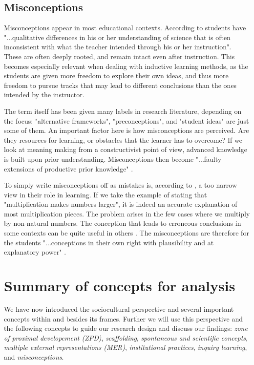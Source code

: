 \subsection{Misconceptions}
Misconceptions appear in most educational contexts. According to \citet[p. 437]{gomez2008elementary} students have "...qualitative differences in his or her understanding of science that is often inconsistent with what the teacher intended through his or her instruction". These are often deeply rooted, and remain intact even after instruction. This becomes especially relevant when dealing with inductive learning methods, as the students are given more freedom to explore their own ideas, and thus more freedom to pursue tracks that may lead to different conclusions than the ones intended by the instructor.

The term itself has been given many labels in research literature, depending on the focus: "alternative frameworks", "preconceptions", and "student ideas" are just some of them. An important factor here is how misconceptions are perceived. Are they resources for learning, or obstacles that the learner has to overcome? If we look at meaning making from a constructivist point of view, advanced knowledge is built upon prior understanding. Misconceptions then become "...faulty extensions of productive prior knowledge" \citep[p. 152]{smith1994misconceptions}.

To simply write misconceptions off as mistakes is, according to \citet{smith1994misconceptions}, a too narrow view in their role in learning. If we take the example of stating that "multiplication makes numbers larger", it is indeed an accurate explanation of most multiplication pieces. The problem arises in the few cases where we multiply by non-natural numbers. The conception that leads to erroneous conclusions in some contexts can be quite useful in others \citep{smith1994misconceptions}. The misconceptions are therefore for the students "...conceptions in their own right with plausibility and at explanatory power" \citetext{\citealp{smith1994misconceptions}, referenced in \citealp{larkin2012misconceptions}, p. 928}. 


\section{Summary of concepts for analysis}
We have now introduced the sociocultural perspective and several important concepts within and besides its frames. Further we will use this perspective and the following concepts to guide our research design and discuss our findings: \emph{zone of proximal developement (ZPD)}, \emph{scaffolding}, \emph{spontaneous and scientific concepts}, \emph{multiple external representations (MER)}, \emph{institutional practices}, \emph{inquiry learning}, and \emph{misconceptions}.

